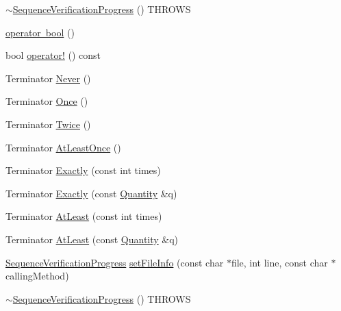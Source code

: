 \begin{DoxyCompactItemize}
\item 
\mbox{\hyperlink{classfakeit_1_1SequenceVerificationProgress_a2c3325aa3d50002ef448d31e21494f76}{$\sim$\+Sequence\+Verification\+Progress}} () T\+H\+R\+O\+WS
\item 
\mbox{\hyperlink{classfakeit_1_1SequenceVerificationProgress_a462f6bec1f00814e918f9be6bd5f84e6}{operator bool}} ()
\item 
bool \mbox{\hyperlink{classfakeit_1_1SequenceVerificationProgress_a43f9268650854f97cbae3b28487c2be0}{operator!}} () const
\item 
Terminator \mbox{\hyperlink{classfakeit_1_1SequenceVerificationProgress_ad71678d34cb297945ecad2e1fe825f31}{Never}} ()
\item 
Terminator \mbox{\hyperlink{classfakeit_1_1SequenceVerificationProgress_a4a3260eb1380fcee1c0d8ae162ea57f4}{Once}} ()
\item 
Terminator \mbox{\hyperlink{classfakeit_1_1SequenceVerificationProgress_ac453e14db60c17c23748cc5f4f2325ca}{Twice}} ()
\item 
Terminator \mbox{\hyperlink{classfakeit_1_1SequenceVerificationProgress_a682eed8897bda26aa2927f0a0b03f0b1}{At\+Least\+Once}} ()
\item 
Terminator \mbox{\hyperlink{classfakeit_1_1SequenceVerificationProgress_a74c04958c69e3c977ce873de3787305d}{Exactly}} (const int times)
\item 
Terminator \mbox{\hyperlink{classfakeit_1_1SequenceVerificationProgress_abb39ac5b5e16e07b1caaf01325228c47}{Exactly}} (const \mbox{\hyperlink{structfakeit_1_1Quantity}{Quantity}} \&q)
\item 
Terminator \mbox{\hyperlink{classfakeit_1_1SequenceVerificationProgress_a83ba8d481bb79dad783f9bc821dd650e}{At\+Least}} (const int times)
\item 
Terminator \mbox{\hyperlink{classfakeit_1_1SequenceVerificationProgress_a1f6e949249d3f8119e920f6df6f7ade2}{At\+Least}} (const \mbox{\hyperlink{structfakeit_1_1Quantity}{Quantity}} \&q)
\item 
\mbox{\hyperlink{classfakeit_1_1SequenceVerificationProgress}{Sequence\+Verification\+Progress}} \mbox{\hyperlink{classfakeit_1_1SequenceVerificationProgress_aeeadb72fd4e0f52c06fa28c6b54d8188}{set\+File\+Info}} (const char $\ast$file, int line, const char $\ast$calling\+Method)
\item 
\mbox{\hyperlink{classfakeit_1_1SequenceVerificationProgress_a2c3325aa3d50002ef448d31e21494f76}{$\sim$\+Sequence\+Verification\+Progress}} () T\+H\+R\+O\+WS
\item 

\end{DoxyCompactItemize}
